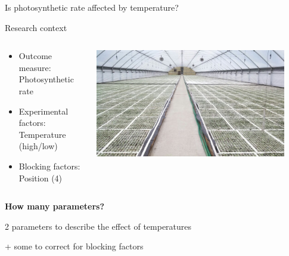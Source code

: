\documentclass{beamer}
\begin{document}
\begin{frame}{Is photosynthetic rate affected by temperature?}

 \begin{block}{Research context}
 \begin{columns}
  \begin{column}{0.8\textwidth}
   \begin{itemize}
    \item Outcome measure: Photosynthetic rate
    \item Experimental factors: Temperature (high/low)
    \item Blocking factors: Position (4)
   \end{itemize}
  \end{column}
  \begin{column}{0.2\textwidth}
    \includegraphics[width=0.9\textwidth]{Figures/photos}
  \end{column}

 \end{columns}
 \end{block}
 
 \textbf{How many parameters?}
 
\pause

2 parameters to describe the effect of temperatures \\

\pause

+ some to correct for blocking factors
 
\end{frame}
\end{document}
